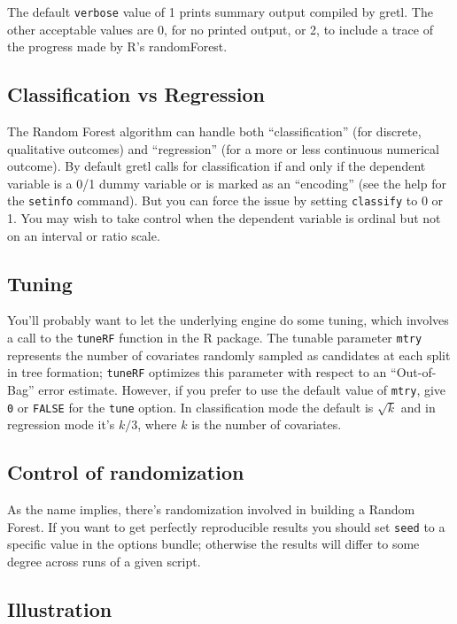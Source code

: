 \documentclass{article}
\begin{document}
The default \texttt{verbose} value of 1 prints summary output compiled
by gretl. The other acceptable values are 0, for no printed output, or
2, to include a trace of the progress made by \textsf{R}'s
\textsf{randomForest}.

\subsection{Classification vs Regression}

The Random Forest algorithm can handle both ``classification'' (for
discrete, qualitative outcomes) and ``regression'' (for a more or less
continuous numerical outcome). By default gretl calls for
classification if and only if the dependent variable is a 0/1 dummy
variable or is marked as an ``encoding'' (see the help for the
\texttt{setinfo} command).  But you can force the issue by setting
\texttt{classify} to 0 or 1. You may wish to take control when the
dependent variable is ordinal but not on an interval or ratio scale.

\subsection{Tuning}

You'll probably want to let the underlying engine do some tuning,
which involves a call to the \texttt{tuneRF} function in the
\textsf{R} package. The tunable parameter \texttt{mtry} represents the
number of covariates randomly sampled as candidates at each split in
tree formation; \texttt{tuneRF} optimizes this parameter with respect
to an ``Out-of-Bag'' error estimate.  However, if you prefer to use
the default value of \texttt{mtry}, give \texttt{0} or \texttt{FALSE}
for the \texttt{tune} option. In classification mode the default is
$\sqrt{k}$ and in regression mode it's $k/3$, where $k$ is the number
of covariates.

\subsection{Control of randomization}

As the name implies, there's randomization involved in building a
Random Forest. If you want to get perfectly reproducible results you
should set \texttt{seed} to a specific value in the options bundle;
otherwise the results will differ to some degree across runs of a
given script.

\subsection{Illustration}
\end{document}
